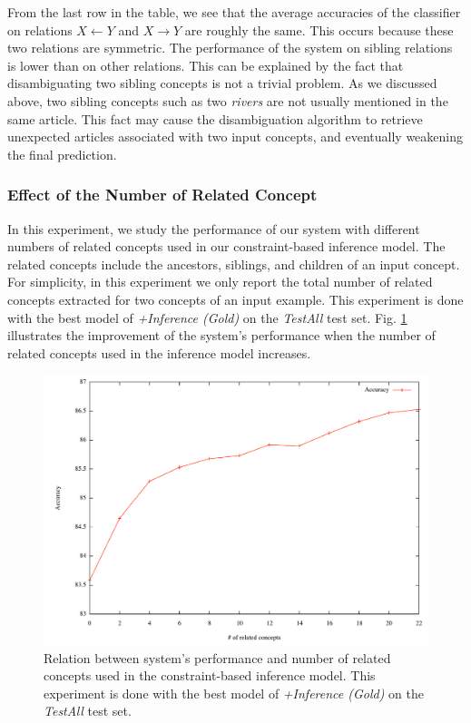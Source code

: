 From the last row in the table, we see that the average accuracies of
the classifier on relations $X \leftarrow Y$ and $X \rightarrow Y$ are
roughly the same. This occurs because these two relations are
symmetric. The performance of the system on sibling relations is lower
than on other relations. This can be explained by the fact that
disambiguating two sibling concepts is not a trivial problem. As we
discussed above, two sibling concepts such as two {\em rivers} are not
usually mentioned in the same article. This fact may cause the
disambiguation algorithm to retrieve unexpected articles associated
with two input concepts, and eventually weakening the final prediction.

\subsubsection{Effect of  the Number of Related Concept}

In this experiment, we study the performance of our system with
different numbers of related concepts used in our constraint-based
inference model. The related concepts include the ancestors,
siblings, and children of an input concept. For simplicity, in this
experiment we only report the total number of related concepts
extracted for two concepts of an input example.  This experiment is
done with the best model of {\em +Inference (Gold)} on the {\em
  TestAll} test set. Fig. \ref{fig:related-concepts} illustrates the
improvement of the system's performance when the number of related
concepts used in the inference model increases.

\begin{figure}[htp]
\centering
\includegraphics[totalheight=0.25\textheight]{relatedconcepts}
\caption{Relation between system's performance and number of related concepts used in the constraint-based inference model. This experiment is done with the best model of {\em +Inference (Gold)} on the {\em TestAll} test set.}
\label{fig:related-concepts}
\end{figure}

